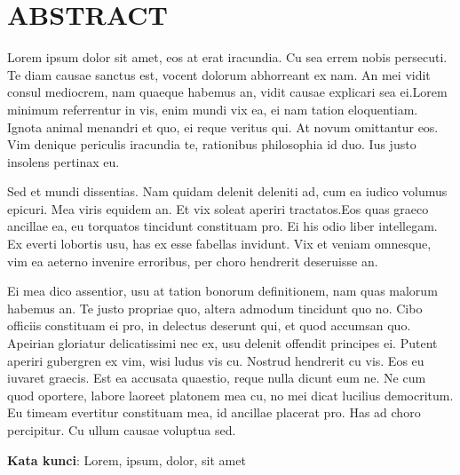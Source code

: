 \chapter{ABSTRACT}
\vspace{0.05cm}

Lorem ipsum dolor sit amet, eos at erat iracundia. Cu sea errem nobis persecuti. Te diam causae sanctus est, vocent dolorum abhorreant ex nam. An mei vidit consul mediocrem, nam quaeque habemus an, vidit causae explicari sea ei.Lorem minimum referrentur in vis, enim mundi vix ea, ei nam tation eloquentiam. Ignota animal menandri et quo, ei reque veritus qui. At novum omittantur eos. Vim denique periculis iracundia te, rationibus philosophia id duo. Ius justo insolens pertinax eu. \par

Sed et mundi dissentias. Nam quidam delenit deleniti ad, cum ea iudico volumus epicuri. Mea viris equidem an. Et vix soleat aperiri tractatos.Eos quas graeco ancillae ea, eu torquatos tincidunt constituam pro. Ei his odio liber intellegam. Ex everti lobortis usu, has ex esse fabellas invidunt. Vix et veniam omnesque, vim ea aeterno invenire erroribus, per choro hendrerit deseruisse an. \par 

Ei mea dico assentior, usu at tation bonorum definitionem, nam quas malorum habemus an. Te justo propriae quo, altera admodum tincidunt quo no. Cibo officiis constituam ei pro, in delectus deserunt qui, et quod accumsan quo. Apeirian gloriatur delicatissimi nec ex, usu delenit offendit principes ei. Putent aperiri gubergren ex vim, wisi ludus vis cu. Nostrud hendrerit cu vis. Eos eu iuvaret graecis. Est ea accusata quaestio, reque nulla dicunt eum ne. Ne cum quod oportere, labore laoreet platonem mea cu, no mei dicat lucilius democritum. Eu timeam evertitur constituam mea, id ancillae placerat pro. Has ad choro percipitur. Cu ullum causae voluptua sed.\par
\vspace{0.05cm}
\textbf{Kata kunci}: Lorem, ipsum, dolor, sit amet